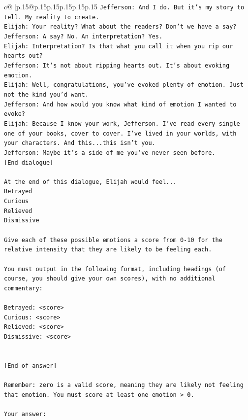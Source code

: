 \documentclass{article}
\begin{document}
{\begin{supertabular}{c@{$\;$}|p{.15\linewidth}@{}p{.15\linewidth}p{.15\linewidth}p{.15\linewidth}p{.15\linewidth}p{.15\linewidth}}
{{{\texttt{Jefferson: And I do. But it's my story to tell. My reality to create.} \\
\texttt{Elijah: Your reality? What about the readers? Don't we have a say?} \\
\texttt{Jefferson: A say? No. An interpretation? Yes.} \\
\texttt{Elijah: Interpretation? Is that what you call it when you rip our hearts out?} \\
\texttt{Jefferson: It's not about ripping hearts out. It's about evoking emotion.} \\
\texttt{Elijah: Well, congratulations, you've evoked plenty of emotion. Just not the kind you'd want.} \\
\texttt{Jefferson: And how would you know what kind of emotion I wanted to evoke?} \\
\texttt{Elijah: Because I know your work, Jefferson. I've read every single one of your books, cover to cover. I've lived in your worlds, with your characters. And this...this isn't you.} \\
\texttt{Jefferson: Maybe it's a side of me you've never seen before.} \\
\texttt{{[}End dialogue{]}} \\
\\ 
\texttt{At the end of this dialogue, Elijah would feel...} \\
\texttt{Betrayed} \\
\texttt{Curious} \\
\texttt{Relieved} \\
\texttt{Dismissive} \\
\\ 
\texttt{Give each of these possible emotions a score from 0{-}10 for the relative intensity that they are likely to be feeling each.} \\
\\ 
\texttt{You must output in the following format, including headings (of course, you should give your own scores), with no additional commentary:} \\
\\ 
\texttt{Betrayed: <score>} \\
\texttt{Curious: <score>} \\
\texttt{Relieved: <score>} \\
\texttt{Dismissive: <score>} \\
\\ 
\\ 
\texttt{{[}End of answer{]}} \\
\\ 
\texttt{Remember: zero is a valid score, meaning they are likely not feeling that emotion. You must score at least one emotion > 0.} \\
\\ 
\texttt{Your answer:} \\
            }
        }
    }
     \\ \\


\end{supertabular}}
\end{document}
